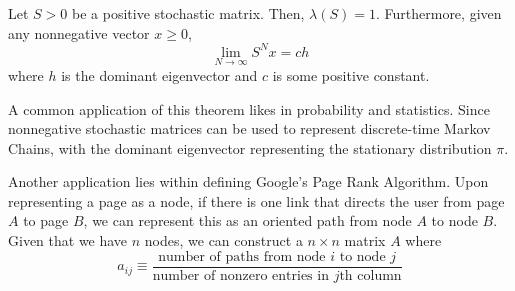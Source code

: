   \begin{theorem}
    Let $S > 0$ be a positive stochastic matrix. Then, $\lambda(S) = 1$. Furthermore, given any nonnegative vector $x \geq 0$, 
    \begin{equation}
      \lim_{N \rightarrow \infty} S^N x = c h
    \end{equation}
    where $h$ is the dominant eigenvector and $c$ is some positive constant. 
  \end{theorem}

  A common application of this theorem likes in probability and statistics. Since nonnegative stochastic matrices can be used to represent discrete-time Markov Chains, with the dominant eigenvector representing the stationary distribution $\pi$. 

  Another application lies within defining Google's Page Rank Algorithm. Upon representing a page as a node, if there is one link that directs the user from page $A$ to page $B$, we can represent this as an oriented path from node $A$ to node $B$. Given that we have $n$ nodes, we can construct a $n \times n$ matrix $A$ where 
  \begin{equation}
    a_{i j} \equiv  \frac{\text{number of paths from node $i$ to node $j$}}{\text{number of nonzero entries in $j$th column}}
  \end{equation}


